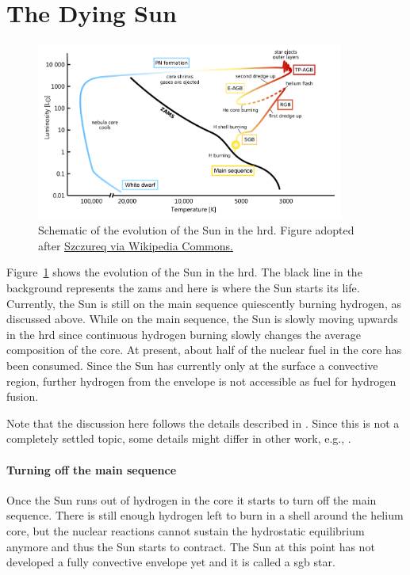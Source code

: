 \section{The Dying Sun}

\begin{figure}[bt]
    \centering
    \includegraphics[width=0.9\textwidth]{graphics/sun/sun_hrd}
    \caption{Schematic of the evolution of the Sun in the \ac{hrd}. Figure adopted after \href{https://commons.wikimedia.org/wiki/File:Evolution_of_the_Sun_2_EN.svg}{Szczureq via Wikipedia Commons.}}
    \label{fig:sun:sun_hrd}
\end{figure}
Figure~\ref{fig:sun:sun_hrd} shows the evolution of the Sun in the \ac{hrd}. The black line in the background represents the \ac{zams} and here is where the Sun starts its life. Currently, the Sun is still on the main sequence quiescently burning hydrogen, as discussed above. While on the main sequence, the Sun is slowly moving upwards in the \ac{hrd} since continuous hydrogen burning slowly changes the average composition of the core. At present, about half of the nuclear fuel in the core has been consumed. Since the Sun has currently only at the surface a convective region, further hydrogen from the envelope is not accessible as fuel for hydrogen fusion. 

Note that the discussion here follows the details described in \citet{iliadis15}. Since this is not a completely settled topic, some details might differ in other work, e.g., \citet{schroeder08}.

\paragraph{Turning off the main sequence}
Once the Sun runs out of hydrogen in the core it starts to turn off the main sequence. There is still enough hydrogen left to burn in a shell around the helium core, but the nuclear reactions cannot sustain the hydrostatic equilibrium anymore and thus the Sun starts to contract. The Sun at this point has not developed a fully convective envelope yet and it is called a \ac{sgb} star.

